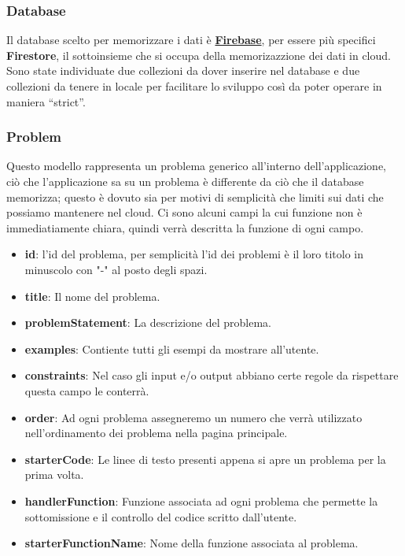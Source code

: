 \documentclass[11pt, a4paper]{article}
\theoremstyle{definition}
\begin{document}
\subsubsection{Database}
Il database scelto per memorizzare i dati è \href{https://firebase.google.com}{\textbf{Firebase}}, per essere più specifici \textbf{Firestore}, il sottoinsieme che si occupa della memorizazzione dei dati in cloud.
Sono state individuate due collezioni da dover inserire nel database e due collezioni da tenere in locale per facilitare lo sviluppo così da poter operare in maniera ``strict''.

\subsubsection*{Problem}
Questo modello rappresenta un problema generico all'interno dell'applicazione, ciò che l'applicazione sa su un problema è differente da ciò che il database memorizza; questo è dovuto sia per motivi di semplicità che limiti sui dati che possiamo mantenere nel cloud.
Ci sono alcuni campi la cui funzione non è immediatiamente chiara, quindi verrà descritta la funzione di ogni campo.  

\begin{itemize}
  \item \textbf{id}: l'id del problema, per semplicità l'id dei problemi è il loro titolo in minuscolo con "-" al posto degli spazi.
  \item \textbf{title}: Il nome del problema.
  \item \textbf{problemStatement}: La descrizione del problema.
  \item \textbf{examples}: Contiente tutti gli esempi da mostrare all'utente.
  \item \textbf{constraints}: Nel caso gli input e/o output abbiano certe regole da rispettare questa campo le conterrà.
  \item \textbf{order}: Ad ogni problema assegneremo un numero che verrà utilizzato nell'ordinamento dei problema nella pagina principale.
  \item \textbf{starterCode}: Le linee di testo presenti appena si apre un problema per la prima volta.
  \item \textbf{handlerFunction}: Funzione associata ad ogni problema che permette la sottomissione e il controllo del codice scritto dall'utente.
  \item \textbf{starterFunctionName}: Nome della funzione associata al problema.
\end{itemize}
\end{document}
